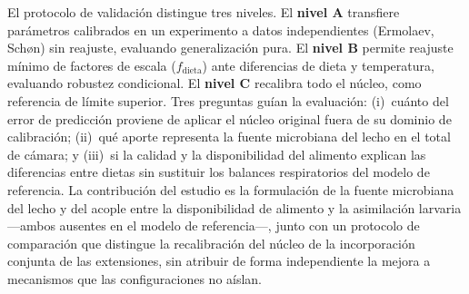El protocolo de validación distingue tres niveles. El \textbf{nivel A}
transfiere parámetros calibrados en un experimento a datos independientes
(Ermolaev, Sch{\o}n) sin reajuste, evaluando generalización pura. El
\textbf{nivel B} permite reajuste mínimo de factores de escala
($f_{\mathrm{dieta}}$) ante diferencias de dieta y temperatura, evaluando
robustez condicional. El \textbf{nivel C} recalibra todo el núcleo, como
referencia de límite superior. Tres preguntas guían la evaluación: (i)~cuánto
del error de predicción proviene de aplicar el núcleo original fuera de su
dominio de calibración; (ii)~qué aporte representa la fuente microbiana del
lecho en el total de cámara; y (iii)~si la calidad y la disponibilidad del
alimento explican las diferencias entre dietas sin sustituir los balances
respiratorios del modelo de referencia. La contribución del estudio es la
formulación de la fuente microbiana del lecho y del acople entre la
disponibilidad de alimento y la asimilación larvaria ---ambos ausentes en el
modelo de referencia---, junto con un protocolo de comparación que distingue
la recalibración del núcleo de la incorporación conjunta de las extensiones,
sin atribuir de forma independiente la mejora a mecanismos que las
configuraciones no aíslan.